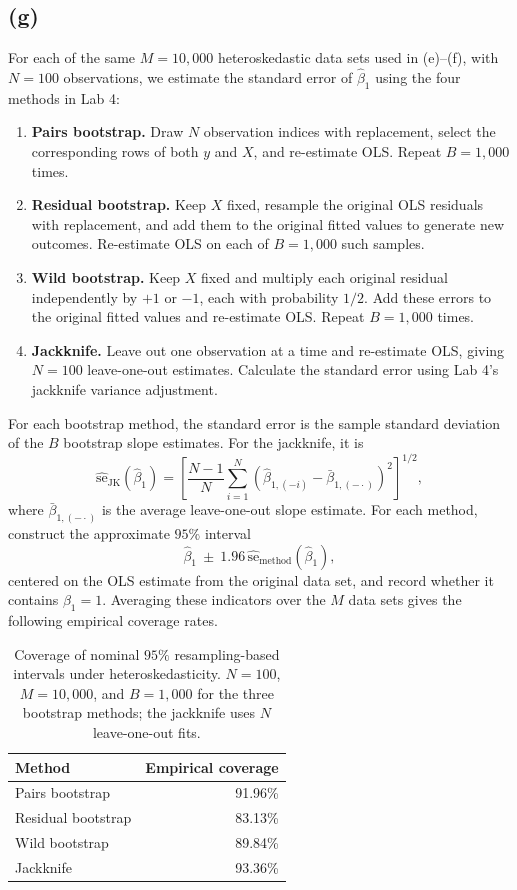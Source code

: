 \documentclass[11pt]{article}
\begin{document}
\subsection{(g)}
For each of the same $M=10{,}000$ heteroskedastic data sets used in
(e)--(f), with $N=100$ observations, we estimate the standard error of
$\hat\beta_1$ using the four methods in Lab 4:
\begin{enumerate}
\item \textbf{Pairs bootstrap.} Draw $N$ observation indices with
replacement, select the corresponding rows of both $y$ and $X$, and
re-estimate OLS. Repeat $B=1{,}000$ times.
\item \textbf{Residual bootstrap.} Keep $X$ fixed, resample the original
OLS residuals with replacement, and add them to the original fitted
values to generate new outcomes. Re-estimate OLS on each of
$B=1{,}000$ such samples.
\item \textbf{Wild bootstrap.} Keep $X$ fixed and multiply each original
residual independently by $+1$ or $-1$, each with probability $1/2$.
Add these errors to the original fitted values and re-estimate OLS.
Repeat $B=1{,}000$ times.
\item \textbf{Jackknife.} Leave out one observation at a time and
re-estimate OLS, giving $N=100$ leave-one-out estimates. Calculate the
standard error using Lab 4's jackknife variance adjustment.
\end{enumerate}

For each bootstrap method, the standard error is the sample standard
deviation of the $B$ bootstrap slope estimates. For the jackknife, it is
\[
\widehat{\text{se}}_{\mathrm{JK}}(\hat\beta_1)
=\left[\frac{N-1}{N}\sum_{i=1}^{N}
 \left(\hat\beta_{1,(-i)}-\bar\beta_{1,(-\cdot)}\right)^2\right]^{1/2},
\]
where $\bar\beta_{1,(-\cdot)}$ is the average leave-one-out slope estimate.
For each method, construct the approximate $95\%$ interval
\[
\hat\beta_1\ \pm\ 1.96\,\widehat{\text{se}}_{\mathrm{method}}(\hat\beta_1),
\]
centered on the OLS estimate from the original data set, and record
whether it contains $\beta_1=1$. Averaging these indicators over the
$M$ data sets gives the following empirical coverage rates.

\begin{table}[htbp]
\centering
\caption{Coverage of nominal $95\%$ resampling-based intervals under
heteroskedasticity. $N=100$, $M=10{,}000$, and $B=1{,}000$ for the three
bootstrap methods; the jackknife uses $N$ leave-one-out fits.}
\label{tab:q4-bootstrap-coverage}
\begin{tabular}{lr}
\toprule
Method & Empirical coverage \\
\midrule
Pairs bootstrap & 91.96\% \\
Residual bootstrap & 83.13\% \\
Wild bootstrap & 89.84\% \\
Jackknife & 93.36\% \\
\bottomrule
\end{tabular}
\end{table}
\end{document}

